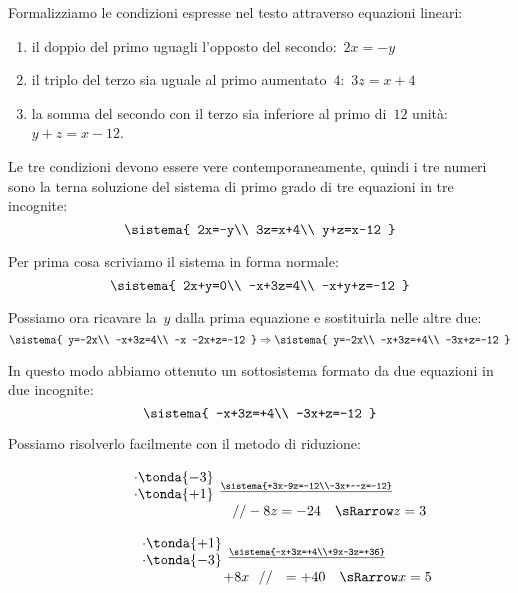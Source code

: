 \begin{soluzione}
Formalizziamo le condizioni espresse nel testo attraverso equazioni
lineari:

\begin{enumerate}[nosep]
\item il doppio del primo uguagli l'opposto del secondo:~\(2x=-y\)
\item il triplo del terzo sia uguale al primo aumentato~\(4\):~\(3z=x+4\)
\item la somma del secondo con il terzo sia inferiore al primo di~\(12\) 
unità:~\(y+z=x-12\).
\end{enumerate}

Le tre condizioni devono essere vere contemporaneamente, quindi i tre
numeri sono la terna soluzione del sistema di primo grado di tre 
equazioni in tre incognite:
\[\sistema{
  2x=-y\\
  3z=x+4\\
  y+z=x-12
}\]

Per prima cosa scriviamo il sistema in forma normale:
\[\sistema{
  2x+y=0\\
  -x+3z=4\\
  -x+y+z=-12
}\]

Possiamo ora ricavare la~\(y\) dalla prima equazione e sostituirla nelle 
altre 
due:
\[\sistema{
  y=-2x\\
  -x+3z=4\\
  -x -2x+z=-12
}
\Rightarrow
\sistema{
  y=-2x\\
  -x+3z=+4\\
  -3x+z=-12
}\]

In questo modo abbiamo ottenuto un sottosistema formato da due equazioni 
in due incognite:
\[\sistema{
  -x+3z=+4\\
  -3x+z=-12
}\]

Possiamo risolverlo facilmente con il metodo di riduzione:

\hspace{-20mm}
\begin{minipage}{.48\textwidth}
\[\stackrel{
  \begin{array}{l}\cdot \tonda{-3}\\ \cdot \tonda{+1}\end{array}
  \underline{\sistema{+3x-9z=-12\\-3x+~~z=-12}}}
  {\qquad \qquad \qquad \qquad \qquad 
   //  -8z  =-24 \quad \sRarrow z=3}\]
\end{minipage}
\begin{minipage}{.48\textwidth}
\[\stackrel{
  \begin{array}{l}\cdot \tonda{+1}\\ \cdot \tonda{-3}\end{array}
  \underline{\sistema{-x+3z=+4\\+9x-3z=+36}}}
  {\qquad \qquad \qquad \qquad 
   ~~~~~ +8x ~~ // ~~ =+40 \quad \sRarrow x=5}\]
\end{minipage}
\vspace{.5em}


\end{soluzione}
